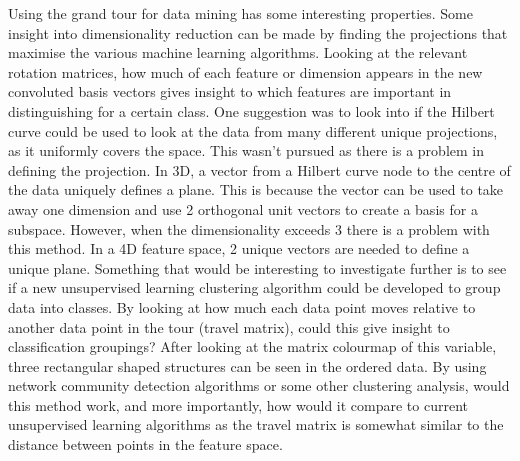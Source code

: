 \documentclass[a4paper,11pt,twoside]{article}
\begin{document}
Using the grand tour for data mining has some interesting properties. Some insight into dimensionality reduction can be made by finding the projections that maximise the various machine learning algorithms. Looking at the relevant rotation matrices, how much of each feature or dimension appears in the new convoluted basis vectors gives insight to which features are important in distinguishing for a certain class.
\newline
\newline
One suggestion was to look into if the Hilbert curve could be used to look at the data from many different unique projections, as it uniformly covers the space. This wasn’t pursued as there is a problem in defining the projection. In 3D, a vector from a Hilbert curve node to the centre of the data uniquely defines a plane. This is because the vector can be used to take away one dimension and use 2 orthogonal unit vectors to create a basis for a subspace. However, when the dimensionality exceeds 3 there is a problem with this method. In a 4D feature space, 2 unique vectors are needed to define a unique plane. 
\newline
\newline
Something that would be interesting to investigate further is to see if a new unsupervised learning clustering algorithm could be developed to group data into classes. By looking at how much each data point moves relative to another data point in the tour (travel matrix), could this give insight to classification groupings? After looking at the matrix colourmap of this variable, three rectangular shaped structures can be seen in the ordered data. By using network community detection algorithms or some other clustering analysis, would this method work, and more importantly, how would it compare to current unsupervised learning algorithms as the travel matrix is somewhat similar to the distance between points in the feature space.
\end{document}
